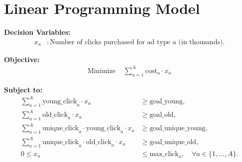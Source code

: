 \documentclass{article}
\begin{document}
\section*{Linear Programming Model}

\textbf{Decision Variables:}
\begin{align*}
x_a & : \text{Number of clicks purchased for ad type } a \text{ (in thousands).}
\end{align*}

\textbf{Objective:}
\begin{align*}
\text{Minimize } & \sum_{a=1}^{A} \text{cost}_a \cdot x_a
\end{align*}

\textbf{Subject to:}
\begin{align*}
\sum_{a=1}^{A} \text{young\_click}_a \cdot x_a & \geq \text{goal\_young}, \\
\sum_{a=1}^{A} \text{old\_click}_a \cdot x_a & \geq \text{goal\_old}, \\
\sum_{a=1}^{A} \text{unique\_click}_a \cdot \text{young\_click}_a \cdot x_a & \geq \text{goal\_unique\_young}, \\
\sum_{a=1}^{A} \text{unique\_click}_a \cdot \text{old\_click}_a \cdot x_a & \geq \text{goal\_unique\_old}, \\
0 \leq x_a & \leq \text{max\_click}_a, \quad \forall a \in \{1, \ldots, A\}.
\end{align*}
\end{document}
